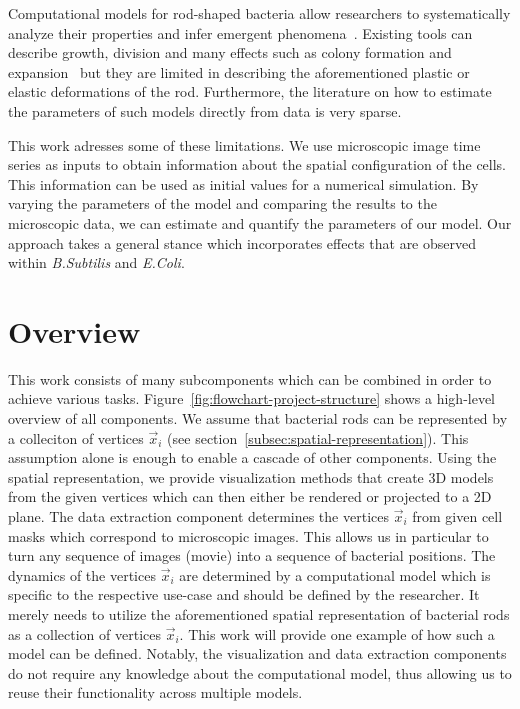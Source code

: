 \documentclass{article}
\begin{document}
Computational models for rod-shaped bacteria allow researchers to systematically analyze their
properties and infer emergent phenomena~\cite{Cho2007,Jnsson2005}.
Existing tools can describe growth, division and many effects such as colony formation and
expansion~\cite{Matyjaszkiewicz2017,Doumic2020} but they are limited in describing the
aforementioned plastic or elastic deformations of the rod.
Furthermore, the literature on how to estimate the parameters of such models directly from data is
very sparse.

This work adresses some of these limitations.
We use microscopic image time series as inputs to obtain information about the spatial
configuration of the cells.
This information can be used as initial values for a numerical simulation.
By varying the parameters of the model and comparing the results to the microscopic data, we can
estimate and quantify the parameters of our model.
Our approach takes a general stance which incorporates effects that are observed within
\textit{B.Subtilis} and \textit{E.Coli}.

% 

\section{Overview}
This work consists of many subcomponents which can be combined in order to achieve various tasks.
Figure~\ref{fig:flowchart-project-structure} shows a high-level overview of all components.
We assume that bacterial rods can be represented by a colleciton of vertices $\vec{x}_i$ (see
section~\ref{subsec:spatial-representation}).
This assumption alone is enough to enable a cascade of other components.
Using the spatial representation, we provide visualization methods that create 3D models from the
given vertices which can then either be rendered or projected to a 2D plane.
The data extraction component determines the vertices $\vec{x}_i$ from given cell masks which
correspond to microscopic images.
This allows us in particular to turn any sequence of images (movie) into a sequence of bacterial
positions.
The dynamics of the vertices $\vec{x}_i$ are determined by a computational model which is specific
to the respective use-case and should be defined by the researcher.
It merely needs to utilize the aforementioned spatial representation of bacterial rods as a
collection of vertices $\vec{x}_i$.
This work will provide one example of how such a model can be defined.
Notably, the visualization and data extraction components do not require any knowledge about the
computational model, thus allowing us to reuse their functionality across multiple models.
\end{document}
